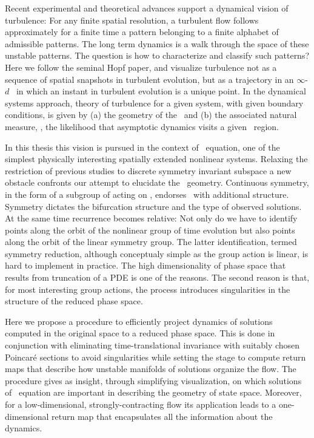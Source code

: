 

Recent experimental and theoretical advances
support a dynamical vision of turbulence:
For any finite  spatial resolution, a turbulent flow follows approximately for a finite time
a pattern belonging to a { finite alphabet} of admissible patterns.
The long term dynamics is a {walk through the space of these unstable patterns}.
The question is how to characterize and classify such patterns?
Here we follow the seminal Hopf paper, and  visualize
turbulence not as  a sequence of spatial snapshots in turbulent evolution,
but as a trajectory in an  $\infty$-$d$ \statesp\ in which an
instant in turbulent evolution is a {unique} point. In the dynamical systems approach,
theory of turbulence for a given system, with given boundary conditions,
is given by (a) the geometry of the \statesp\ and (b) the associated natural measure,
\ie, the likelihood that asymptotic dynamics visits a given \statesp\ region.

In this thesis this vision is pursued in the context of \KS\ equation,
one of the simplest physically interesting spatially extended
nonlinear systems. Relaxing the restriction of previous studies
to discrete symmetry invariant subspace a new obstacle confronts our attempt to elucidate
the \statesp\ geometry. Continuous symmetry, in the form of a subgroup of  acting on \statesp, 
endorses \statesp\ with additional structure. Symmetry dictates the bifurcation
structure and the type of observed solutions. At the same time recurrence
becomes relative: Not only do we have to identify points along the orbit of the 
nonlinear group of time evolution but also points along the orbit of the linear symmetry group.
The latter identification, termed symmetry reduction, although conceptualy simple as the group action is linear, 
is hard to implement in practice. The high dimensionality of phase space that results from truncation
of a PDE is one of the reasons. The second reason is that, for most interesting group actions,
the process introduces singularities in the structure of the reduced phase space. 

Here we propose a procedure to efficiently project dynamics of solutions computed in the original
space to a reduced phase space. This is done in conjunction with eliminating time-translational
invariance with suitably chosen Poincar\'e sections to avoid singularities while setting the stage
to compute return maps that describe how unstable manifolds of solutions organize the flow. 
The procedure gives as insight, through simplifying visualization, on which solutions of \KS\ equation
are important in describing the geometry of state space. Moreover, for a low-dimensional, strongly-contracting flow
its application leads to a one-dimensional return map that encapsulates all the information about the
dynamics.


